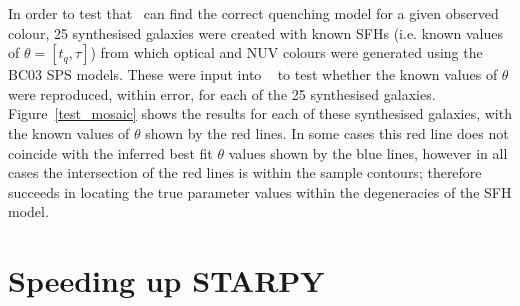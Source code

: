 In order to test that \starpy ~can find the correct quenching model for a given observed colour, 25 synthesised galaxies were created with known SFHs (i.e. known values of $\theta = [t_q, \tau]$) from which optical and NUV colours were generated using the BC03 SPS models. These were input into \starpy ~ to test whether the known values of $\theta$ were reproduced, within error, for each of the 25 synthesised galaxies. Figure~\ref{test_mosaic} shows the results for each of these synthesised galaxies, with the known values of $\theta$ shown by the red lines. In some cases this red line does not coincide with the inferred best fit $\theta$ values shown by the blue lines, however in all cases the intersection of the red lines is within the sample contours; therefore \starpy succeeds in locating the true parameter values within the degeneracies of the SFH model. 

\section{Speeding up STARPY}\label{lookuptable}

